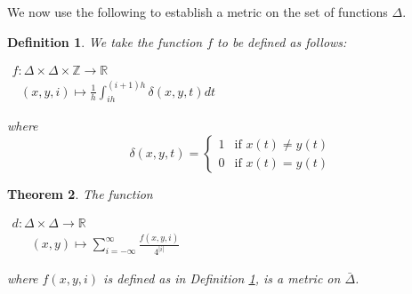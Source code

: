 \documentclass[11pt]{article}
\newtheorem{thm}{Theorem}
\newtheorem{defn}[thm]{Definition}
\begin{document}
We now use the following to establish a metric on the set of functions $\Delta$.

\begin{defn}\label{bardeltafunction}
We take the function $f$ to be defined as follows:
\begin{center}
$\begin{array}{lc}
f: \Delta \times \Delta \times \mathbb{Z} \rightarrow \mathbb{R} \\ 
\,\,\,\,(x, y, i) \mapsto \frac{1}{h}\displaystyle\int_{ih}^{(i+1)h}{\delta(x,y,t)dt}
\end{array}$
\end{center}
where 
$$ \delta(x,y,t) =  \left \{ \begin{array}{cc}
1 & \mbox{if } x(t) \neq y(t)\\
0 & \mbox{if } x(t) = y(t)
\end{array} \right.$$
\end{defn}

\begin{thm}\label{bardeltafunctionmetric}
The function
\begin{center}
$
\begin{array}{lc}
 d: \Delta \times \Delta \rightarrow \mathbb{R} \\
 \,\,\,\,\,\,\,\,\,(x,y) \mapsto \displaystyle \sum_{i = - \infty}^{\infty}\frac{f(x,y,i)}{4^{|i|}}
\end{array} $
\end{center}
where $f(x,y,i)$ is defined as in Definition \ref{bardeltafunction}, is a metric on $\bar{\Delta}$.
\end{thm}
\end{document}
